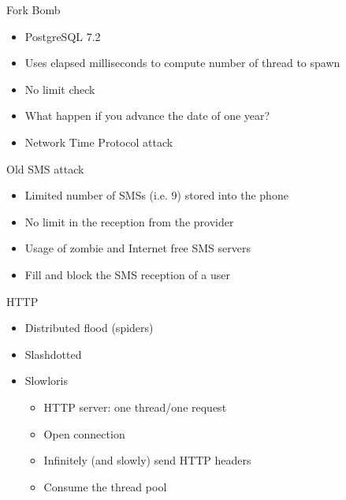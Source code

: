 \documentclass{beamer}
\begin{document}
\begin{frame}{Fork Bomb}
  \begin{itemize}
  \item PostgreSQL 7.2
  \item Uses elapsed milliseconds to compute number of thread to spawn
  \item No limit check
  \item<2-> What happen if you advance the date of one year?
  \item<3-> Network Time Protocol attack
 \end{itemize}
\end{frame}

\begin{frame}{Old SMS attack}
  \begin{itemize}
  \item Limited number of SMSs (i.e. 9) stored into the phone
  \item No limit in the reception from the provider
  \item Usage of zombie and Internet free SMS servers
  \item Fill and block the SMS reception of a user
 \end{itemize}
\end{frame}

\begin{frame}{HTTP}
  \begin{itemize}
  \item Distributed flood (spiders)
  \item Slashdotted
  \item Slowloris
  \begin{itemize}
    \item HTTP server: one thread/one request
    \item Open connection
    \item Infinitely (and slowly) send HTTP headers
    \item Consume the thread pool
  \end{itemize}
 \end{itemize}
\end{frame}
\end{document}
